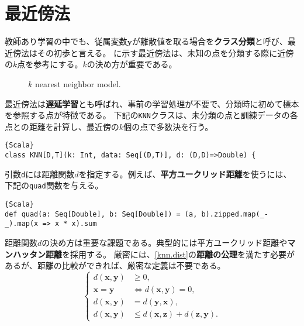 \documentclass[10pt,a4paper]{book}
\begin{document}
\section{最近傍法\label{sect:intro.knn}}

教師あり学習の中でも、従属変数$\bm{y}$が離散値を取る場合を\textbf{クラス分類}と呼び、最近傍法はその初歩と言える。
に示す最近傍法は、未知の点を分類する際に近傍の$k$点を参考にする。$k$の決め方が重要である。

\begin{figure}[h]
\centering
{}
\caption{$k$ nearest neighbor model.\label{fig:knn}}
\end{figure}

最近傍法は\textbf{遅延学習}とも呼ばれ、事前の学習処理が不要で、分類時に初めて標本を参照する点が特徴である。
下記の\texttt{KNN}クラスは、未分類の点と訓練データの各点との距離を計算し、最近傍の$k$個の点で多数決を行う。

\begin{Verbatim}{Scala}
class KNN[D,T](k: Int, data: Seq[(D,T)], d: (D,D)=>Double) {
\end{Verbatim}

引数\texttt{d}には距離関数$d$を指定する。例えば、\textbf{平方ユークリッド距離}を使うには、下記の\texttt{quad}関数を与える。

\begin{Verbatim}{Scala}
def quad(a: Seq[Double], b: Seq[Double]) = (a, b).zipped.map(_-_).map(x => x * x).sum
\end{Verbatim}

距離関数$d$の決め方は重要な課題である。典型的には平方ユークリッド距離や\textbf{マンハッタン距離}を採用する。
厳密には、\eqref{knn.dist}の\textbf{距離の公理}を満たす必要があるが、距離の比較ができれば、厳密な定義は不要である。
%
\begin{equation}
\label{eq:knn.dist}
\left\{
\begin{aligned}
d(\bm{x}, \bm{y}) &\geq 0, \\
\bm{x} = \bm{y} &\Leftrightarrow d(\bm{x}, \bm{y}) = 0, \\
d(\bm{x}, \bm{y}) &= d(\bm{y}, \bm{x}), \\
d(\bm{x}, \bm{y}) &\leq d(\bm{x}, \bm{z}) + d(\bm{z}, \bm{y}).
\end{aligned}
\right.
\end{equation}
\end{document}
